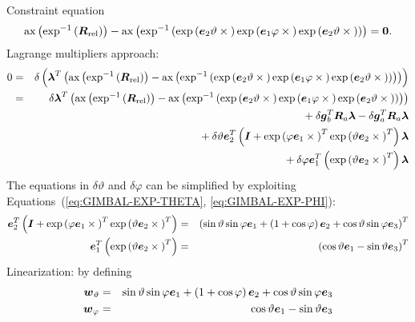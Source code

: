 \documentclass[10pt,dvips,fleqn]{report}
\newcommand{\T}[1]{\boldsymbol{#1}}
\begin{document}
\noindent
Constraint equation
\begin{equation}
	\llk{ax}\plbr{\llk{exp}^{-1}\plbr{\T{R}_{\text{rel}}}}
	- \llk{ax}\plbr{\llk{exp}^{-1}\plbr{
		\llk{exp}\plbr{\T{e}_2 \vartheta \times{}}
		\llk{exp}\plbr{\T{e}_1 \varphi \times{}}
		\llk{exp}\plbr{\T{e}_2 \vartheta \times{}}
	}} = \T{0}.
	\label{eq:GIMBAL-CONSTRAINT}
\end{equation}
Lagrange multipliers approach:
\begin{eqnarray*}
	0 & = & \delta\plbr{\T{\lambda}^T\plbr{
	\llk{ax}\plbr{\llk{exp}^{-1}\plbr{\T{R}_{\text{rel}}}}
	- \llk{ax}\plbr{\llk{exp}^{-1}\plbr{
		\llk{exp}\plbr{\T{e}_2 \vartheta \times{}}
		\llk{exp}\plbr{\T{e}_1 \varphi \times{}}
		\llk{exp}\plbr{\T{e}_2 \vartheta \times{}}
	}}
	}} \\
	& = & \delta\T{\lambda}^T \plbr{
	\llk{ax}\plbr{\llk{exp}^{-1}\plbr{\T{R}_{\text{rel}}}}
	- \llk{ax}\plbr{\llk{exp}^{-1}\plbr{
		\llk{exp}\plbr{\T{e}_2 \vartheta \times{}}
		\llk{exp}\plbr{\T{e}_1 \varphi \times{}}
		\llk{exp}\plbr{\T{e}_2 \vartheta \times{}}
	}}
	} \\
	& & \mbox{} + \delta\T{g}_b^T \T{R}_a \T{\lambda}
	- \delta\T{g}_a^T \T{R}_a \T{\lambda} \\
	& & \mbox{} + \delta\vartheta \T{e}_2^T \plbr{
		\T{I} + \llk{exp}\plbr{\varphi \T{e}_1 \times{}}^T
			\llk{exp}\plbr{\vartheta \T{e}_2 \times{}}^T
	} \T{\lambda} \\
	& & \mbox{} + \delta\varphi \T{e}_1^T \plbr{
		\llk{exp}\plbr{\vartheta \T{e}_2 \times{}}^T
	} \T{\lambda}
\end{eqnarray*}
The equations in $\delta\vartheta $ and $\delta\varphi$ can be simplified
by exploiting Equations~(\ref{eq:GIMBAL-EXP-THETA}, \ref{eq:GIMBAL-EXP-PHI}):
\begin{eqnarray*}
	\T{e}_2^T \plbr{
		\T{I} + \llk{exp}\plbr{\varphi \T{e}_1 \times{}}^T
			\llk{exp}\plbr{\vartheta \T{e}_2 \times{}}^T
	} & = & \plbr{
		\sin\vartheta \sin\varphi \T{e}_1
		+ \plbr{1 + \cos\varphi} \T{e}_2 
		+ \cos\vartheta\sin\varphi \T{e}_3
	}^T \\
	\T{e}_1^T \plbr{
		\llk{exp}\plbr{\vartheta \T{e}_2 \times{}}^T
	} & = & \plbr{
		\cos\vartheta \T{e}_1 - \sin\vartheta \T{e}_3
	}^T 
\end{eqnarray*}
Linearization: by defining
\begin{eqnarray*}
	\T{w}_{\vartheta} & = & 
		\sin\vartheta \sin\varphi \T{e}_1
		+ \plbr{1 + \cos\varphi} \T{e}_2 
		+ \cos\vartheta\sin\varphi \T{e}_3 \\
	\T{w}_{\varphi} & = & 
		\cos\vartheta \T{e}_1 - \sin\vartheta \T{e}_3
\end{eqnarray*}
\end{document}
